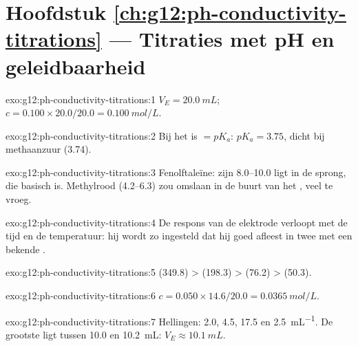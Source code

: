 \section*{Hoofdstuk \ref{ch:g12:ph-conductivity-titrations} --- Titraties met pH en geleidbaarheid}

\begin{solution}{exo:g12:ph-conductivity-titrations:1}
$V_E = \qty{20.0}{mL}$; $c = 0.100 \times 20.0 / 20.0 = \qty{0.100}{mol/L}$.
\end{solution}

\begin{solution}{exo:g12:ph-conductivity-titrations:2}
Bij het  is  $= pK_a$: $pK_a = 3.75$, dicht bij
methaanzuur (3.74).
\end{solution}

\begin{solution}{exo:g12:ph-conductivity-titrations:3}
Fenolftaleïne: zijn  8.0--10.0 ligt in de sprong, die
basisch is. Methylrood (4.2--6.3) zou omslaan in de buurt van het
, veel te vroeg.
\end{solution}

\begin{solution}{exo:g12:ph-conductivity-titrations:4}
De respons van de elektrode verloopt met de tijd en de temperatuur: hij
wordt zo ingesteld dat hij goed afleest in twee  met een
bekende .
\end{solution}

\begin{solution}{exo:g12:ph-conductivity-titrations:5}
 (349.8) >  (198.3) >  (76.2) >  (50.3).
\end{solution}

\begin{solution}{exo:g12:ph-conductivity-titrations:6}
$c = 0.050 \times 14.6 / 20.0 = \qty{0.0365}{mol/L}$.
\end{solution}

\begin{solution}{exo:g12:ph-conductivity-titrations:7}
Hellingen: 2.0, 4.5, 17.5 en \qty{2.5}{mL^{-1}}. De grootste ligt tussen
10.0 en \qty{10.2}{mL}: $V_E \approx \qty{10.1}{mL}$.
\end{solution}

